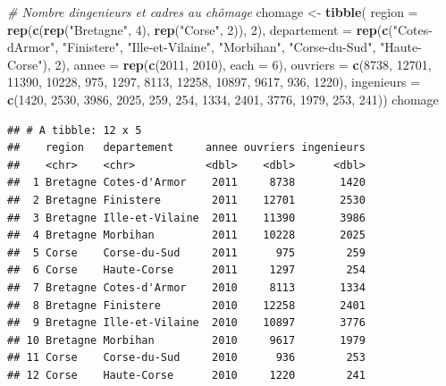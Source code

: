 \documentclass[
  11pt,
]{book}
\newenvironment{Shaded}{\begin{snugshade}}{\end{snugshade}}
\newcommand{\CommentTok}[1]{\textcolor[rgb]{0.56,0.35,0.01}{\textit{#1}}}
\newcommand{\DataTypeTok}[1]{\textcolor[rgb]{0.13,0.29,0.53}{#1}}
\newcommand{\DecValTok}[1]{\textcolor[rgb]{0.00,0.00,0.81}{#1}}
\newcommand{\KeywordTok}[1]{\textcolor[rgb]{0.13,0.29,0.53}{\textbf{#1}}}
\newcommand{\NormalTok}[1]{#1}
\newcommand{\StringTok}[1]{\textcolor[rgb]{0.31,0.60,0.02}{#1}}
\numberwithin{equation}{section}
\numberwithin{countremarque}{section}
\begin{document}
\begin{Shaded}
\begin{Highlighting}[]
\CommentTok{\# Nombre d\textquotesingle{}ingenieurs et cadres au chômage}
\NormalTok{chomage \textless{}{-}}\StringTok{ }\KeywordTok{tibble}\NormalTok{(}
  \DataTypeTok{region =} \KeywordTok{rep}\NormalTok{(}\KeywordTok{c}\NormalTok{(}\KeywordTok{rep}\NormalTok{(}\StringTok{"Bretagne"}\NormalTok{, }\DecValTok{4}\NormalTok{), }\KeywordTok{rep}\NormalTok{(}\StringTok{"Corse"}\NormalTok{, }\DecValTok{2}\NormalTok{)), }\DecValTok{2}\NormalTok{),}
  \DataTypeTok{departement =} \KeywordTok{rep}\NormalTok{(}\KeywordTok{c}\NormalTok{(}\StringTok{"Cotes{-}d\textquotesingle{}Armor"}\NormalTok{, }\StringTok{"Finistere"}\NormalTok{,}
                      \StringTok{"Ille{-}et{-}Vilaine"}\NormalTok{, }\StringTok{"Morbihan"}\NormalTok{,}
                      \StringTok{"Corse{-}du{-}Sud"}\NormalTok{, }\StringTok{"Haute{-}Corse"}\NormalTok{), }\DecValTok{2}\NormalTok{), }
  \DataTypeTok{annee =} \KeywordTok{rep}\NormalTok{(}\KeywordTok{c}\NormalTok{(}\DecValTok{2011}\NormalTok{, }\DecValTok{2010}\NormalTok{), }\DataTypeTok{each =} \DecValTok{6}\NormalTok{),}
  \DataTypeTok{ouvriers =} \KeywordTok{c}\NormalTok{(}\DecValTok{8738}\NormalTok{, }\DecValTok{12701}\NormalTok{, }\DecValTok{11390}\NormalTok{, }\DecValTok{10228}\NormalTok{, }\DecValTok{975}\NormalTok{, }\DecValTok{1297}\NormalTok{,}
               \DecValTok{8113}\NormalTok{, }\DecValTok{12258}\NormalTok{, }\DecValTok{10897}\NormalTok{, }\DecValTok{9617}\NormalTok{, }\DecValTok{936}\NormalTok{, }\DecValTok{1220}\NormalTok{), }
  \DataTypeTok{ingenieurs =} \KeywordTok{c}\NormalTok{(}\DecValTok{1420}\NormalTok{, }\DecValTok{2530}\NormalTok{, }\DecValTok{3986}\NormalTok{, }\DecValTok{2025}\NormalTok{, }\DecValTok{259}\NormalTok{, }\DecValTok{254}\NormalTok{,}
                 \DecValTok{1334}\NormalTok{, }\DecValTok{2401}\NormalTok{, }\DecValTok{3776}\NormalTok{, }\DecValTok{1979}\NormalTok{, }\DecValTok{253}\NormalTok{, }\DecValTok{241}\NormalTok{))}
\NormalTok{chomage}
\end{Highlighting}
\end{Shaded}

\begin{lstlisting}
## # A tibble: 12 x 5
##    region   departement     annee ouvriers ingenieurs
##    <chr>    <chr>           <dbl>    <dbl>      <dbl>
##  1 Bretagne Cotes-d'Armor    2011     8738       1420
##  2 Bretagne Finistere        2011    12701       2530
##  3 Bretagne Ille-et-Vilaine  2011    11390       3986
##  4 Bretagne Morbihan         2011    10228       2025
##  5 Corse    Corse-du-Sud     2011      975        259
##  6 Corse    Haute-Corse      2011     1297        254
##  7 Bretagne Cotes-d'Armor    2010     8113       1334
##  8 Bretagne Finistere        2010    12258       2401
##  9 Bretagne Ille-et-Vilaine  2010    10897       3776
## 10 Bretagne Morbihan         2010     9617       1979
## 11 Corse    Corse-du-Sud     2010      936        253
## 12 Corse    Haute-Corse      2010     1220        241
\end{lstlisting}
\end{document}
